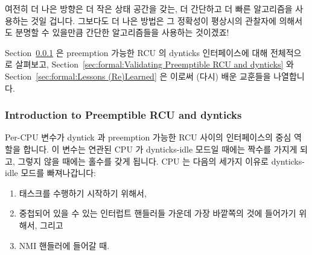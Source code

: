 여전히 더 나은 방향은 더 작은 상태 공간을 갖는, 더 간단하고 더 빠른 알고리즘을
사용하는 것일 겁니다.
그보다도 더 나은 방법은 그 정확성이 평상시의 관찰자에 의해서도 분명할 수
있을만큼 간단한 알고리즘들을 사용하는 것이겠죠!
\iffalse

Still better would be to come up with a simpler and faster algorithm
that has a smaller state space.
Even better would be an algorithm so simple that its correctness was
obvious to the casual observer!
\fi

Section~\ref{sec:formal:Introduction to Preemptible RCU and dynticks}
은 preemption 가능한 RCU 의 dynticks 인터페이스에 대해 전체적으로 살펴보고,
Section~\ref{sec:formal:Validating Preemptible RCU and dynticks} 와
Section~\ref{sec:formal:Lessons (Re)Learned} 은 이로써 (다시) 배운 교훈들을
나열합니다.
\iffalse

Section~\ref{sec:formal:Introduction to Preemptible RCU and dynticks}
gives an overview of preemptible RCU's dynticks interface,
Section~\ref{sec:formal:Validating Preemptible RCU and dynticks},
and
Section~\ref{sec:formal:Lessons (Re)Learned} lists
lessons (re)learned during this effort.
\fi

\subsubsection{Introduction to Preemptible RCU and dynticks}
\label{sec:formal:Introduction to Preemptible RCU and dynticks}

Per-CPU  변수가 dyntick 과 preemption 가능한 RCU
사이의 인터페이스의 중심 역할을 합니다.
이 변수는 연관된 CPU 가 dynticks-idle 모드일 때에는 짝수를 가지게 되고, 그렇지
않을 때에는 홀수를 갖게 됩니다.
CPU 는 다음의 세가지 이유로 dynticks-idle 모드를 빠져나갑니다:
\iffalse

The per-CPU \co{dynticks_progress_counter} variable is
central to the interface between dynticks and preemptible RCU.
This variable has an even value whenever the corresponding CPU
is in dynticks-idle mode, and an odd value otherwise.
A CPU exits dynticks-idle mode for the following three reasons:
\fi

\begin{enumerate}
\item	태스크를 수행하기 시작하기 위해서,
\item	중첩되어 있을 수 있는 인터럽트 핸들러들 가운데 가장 바깥쪽의 것에
	들어가기 위해서, 그리고
\item	NMI 핸들러에 들어갈 때.
\iffalse

\item	to start running a task,
\item	when entering the outermost of a possibly nested set of interrupt
	handlers, and
\item	when entering an NMI handler.
\fi
\end{enumerate}


